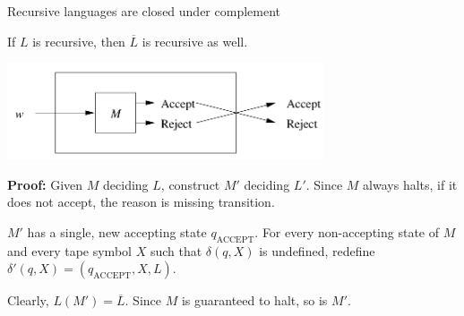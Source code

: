 \documentclass[handout]{beamer}
\begin{document}
\begin{frame}{Recursive languages are closed under complement}

    \begin{lemma}
        If $L$ is recursive, then $\overline{L}$ is recursive as well.
    \end{lemma}

    \begin{center}
        \includegraphics[width=0.7\textwidth]{files/compRec.PNG}
    \end{center}

    \textbf{Proof:} Given $M$ deciding $L$, construct $M'$ deciding $L'$. Since $M$ always halts, if it does not accept, the reason is missing transition. 
    
    \medskip $M'$ has a single, new accepting state $q_\text{ACCEPT}$. For every non-accepting state of $M$ and every tape symbol $X$ such that $\delta(q,X)$ is undefined, redefine $\delta'(q,X)=(q_\text{ACCEPT},X,L)$. 
    

    Clearly, $L(M')=\overline{L}$. Since $M$ is guaranteed to halt, so is $M'$.\hfill\qedsymbol    

\end{frame}
\end{document}
